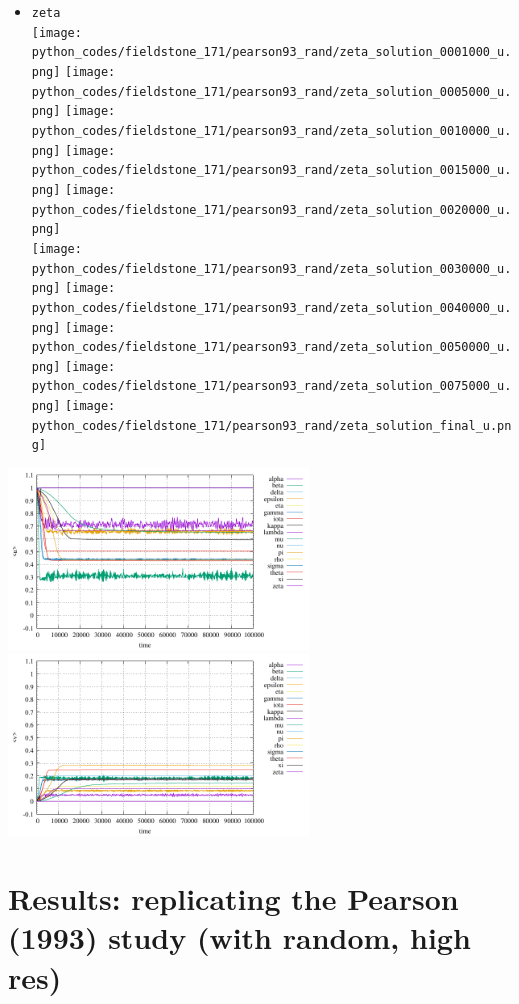 \begin{itemize}
\item {\tt zeta}\\
\texttt{[image: python\_codes/fieldstone\_171/pearson93\_rand/zeta\_solution\_0001000\_u.png]}
\texttt{[image: python\_codes/fieldstone\_171/pearson93\_rand/zeta\_solution\_0005000\_u.png]}
\texttt{[image: python\_codes/fieldstone\_171/pearson93\_rand/zeta\_solution\_0010000\_u.png]}
\texttt{[image: python\_codes/fieldstone\_171/pearson93\_rand/zeta\_solution\_0015000\_u.png]}
\texttt{[image: python\_codes/fieldstone\_171/pearson93\_rand/zeta\_solution\_0020000\_u.png]}\\
\texttt{[image: python\_codes/fieldstone\_171/pearson93\_rand/zeta\_solution\_0030000\_u.png]}
\texttt{[image: python\_codes/fieldstone\_171/pearson93\_rand/zeta\_solution\_0040000\_u.png]}
\texttt{[image: python\_codes/fieldstone\_171/pearson93\_rand/zeta\_solution\_0050000\_u.png]}
\texttt{[image: python\_codes/fieldstone\_171/pearson93\_rand/zeta\_solution\_0075000\_u.png]}
\texttt{[image: python\_codes/fieldstone\_171/pearson93\_rand/zeta\_solution\_final\_u.png]}

\end{itemize}




\includegraphics[width=8cm]{python_codes/fieldstone_171/pearson93_rand/stats_u.pdf}
\includegraphics[width=8cm]{python_codes/fieldstone_171/pearson93_rand/stats_v.pdf}

\newpage
\section*{Results: replicating the Pearson (1993) study (with random, high res)}

